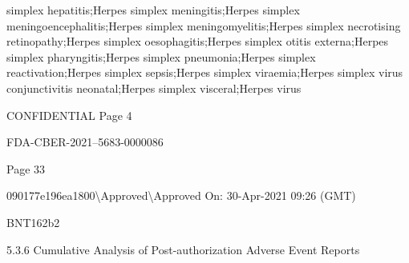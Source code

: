 \begin{refsection}
\begin{tcolorbox}[quote]
simplex hepatitis;Herpes simplex meningitis;Herpes simplex meningoencephalitis;Herpes simplex meningomyelitis;Herpes simplex necrotising retinopathy;Herpes simplex oesophagitis;Herpes simplex otitis externa;Herpes simplex pharyngitis;Herpes simplex pneumonia;Herpes simplex reactivation;Herpes simplex sepsis;Herpes simplex viraemia;Herpes simplex virus conjunctivitis neonatal;Herpes simplex visceral;Herpes virus

CONFIDENTIAL Page 4

FDA-CBER-2021--5683-0000086

Page 33

090177e196ea1800\textbackslash{}Approved\textbackslash{}Approved On: 30-Apr-2021 09:26 (GMT)

BNT162b2

5.3.6 Cumulative Analysis of Post-authorization Adverse Event Reports


\end{tcolorbox}
\end{refsection}
